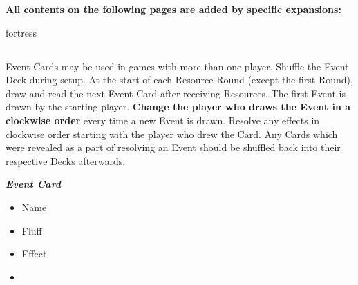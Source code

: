 \textbf{All contents on the following pages are added by specific expansions:}
\begin{multicols*}{2}
\begin{expansion}{fortress}
  \subsection*{}
  Event Cards may be used in games with more than one player.
  Shuffle the Event Deck during setup.
  At the start of each Resource Round (except the first Round), draw and read the next Event Card after receiving Resources.
  The first Event is drawn by the starting player.
  \textbf{Change the player who draws the Event in a clockwise order} every time a new Event is drawn.
  Resolve any effects in clockwise order starting with the player who drew the Card.
  Any Cards which were revealed as a part of resolving an Event should be shuffled back into their respective Decks afterwards.

  \medskip

  \begin{minipage}[h]{\linewidth}
    \vspace{0.1pt}
    \centering
    \begin{scriptsize}
    \end{scriptsize}
    \footnotesize
    \textbf{\textit{\textcolor{darkcandyapplered}{Event Card}}}
    \begin{multicols}{2}
      \begin{itemize}
        \item[\textbf{1.}] Name
        \item[\textbf{2.}] Fluff
        \item[\textbf{3.}] Effect
        \item[\textbf{\phantom{.}}] \phantom{.}
      \end{itemize}
    \end{multicols}
  \end{minipage}
\end{expansion}


\end{multicols*}
